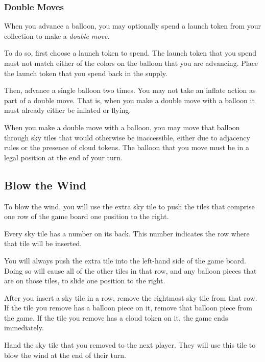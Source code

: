\documentclass[a6paper, 11pt, parskip=half, DIV=15]{scrartcl}
\begin{document}
\newpage
\enlargethispage{1.75\baselineskip}

\subsubsection*{Double Moves}
When you advance a balloon, you may optionally spend a launch token from your collection to make a \emph{double move}.

To do so, first choose a launch token to spend. The launch token that you spend must not match either of the colors on the balloon that you are advancing. Place the launch token that you spend back in the supply.

Then, advance a single balloon two times. You may not take an inflate action as part of a double move. That is, when you make a double move with a balloon it must already either be inflated or flying.

When you make a double move with a balloon, you may move that balloon through sky tiles that would otherwise be inaccessible, either due to adjacency rules or the presence of cloud tokens. The balloon that you move must be in a legal position at the end of your turn.



\newpage
\enlargethispage{1.75\baselineskip}

\subsection*{Blow the Wind}
To blow the wind, you will use the extra sky tile to push the tiles that comprise one row of the game board one position to the right.

Every sky tile has a number on its back. This number indicates the row where that tile will be inserted.

You will always push the extra tile into the left-hand side of the game board.
Doing so will cause all of the other tiles in that row, and any balloon pieces that are on those tiles, to slide one position to the right.

After you insert a sky tile in a row, remove the rightmost sky tile from that row.
If the tile you remove has a balloon piece on it, remove that balloon piece from the game.
If the tile you remove has a cloud token on it, the game ends immediately.

Hand the sky tile that you removed to the next player.
They will use this tile to blow the wind at the end of their turn.


\newpage
\enlargethispage{1.75\baselineskip}
\end{document}
